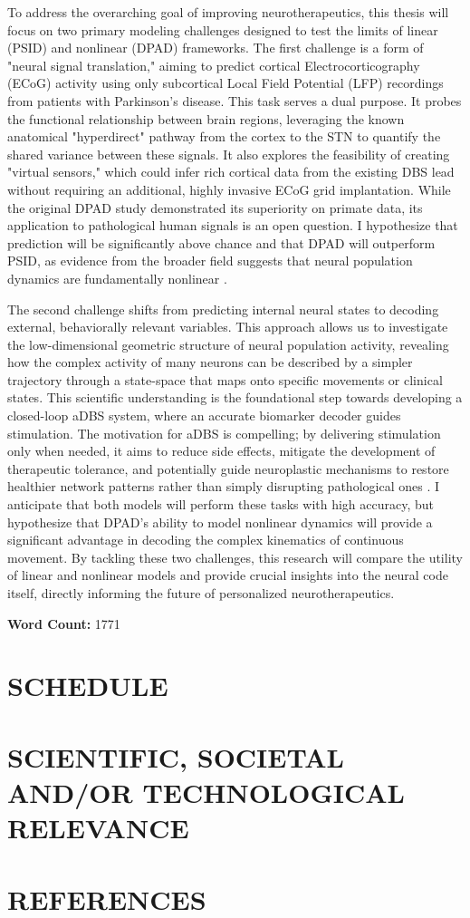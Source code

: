 \documentclass[12pt, a4paper]{article}
\begin{document}
To address the overarching goal of improving neurotherapeutics, this thesis will focus on two primary modeling challenges designed to test the limits of linear (PSID) and nonlinear (DPAD) frameworks. The first challenge is a form of "neural signal translation," aiming to predict cortical Electrocorticography (ECoG) activity using only subcortical Local Field Potential (LFP) recordings from patients with Parkinson's disease. This task serves a dual purpose. It probes the functional relationship between brain regions, leveraging the known anatomical "hyperdirect" pathway from the cortex to the STN \parencite{nambuFunctionalSignificanceCortico2002} to quantify the shared variance between these signals. It also explores the feasibility of creating "virtual sensors," which could infer rich cortical data from the existing DBS lead without requiring an additional, highly invasive ECoG grid implantation. While the original DPAD study demonstrated its superiority on primate data, its application to pathological human signals is an open question. I hypothesize that prediction will be significantly above chance and that DPAD will outperform PSID, as evidence from the broader field suggests that neural population dynamics are fundamentally nonlinear \parencite{breakspearDynamicModelsLargescale2017}.

The second challenge shifts from predicting internal neural states to decoding external, behaviorally relevant variables. This approach allows us to investigate the low-dimensional geometric structure of neural population activity, revealing how the complex activity of many neurons can be described by a simpler trajectory through a state-space that maps onto specific movements or clinical states. This scientific understanding is the foundational step towards developing a closed-loop aDBS system, where an accurate biomarker decoder guides stimulation. The motivation for aDBS is compelling; by delivering stimulation only when needed, it aims to reduce side effects, mitigate the development of therapeutic tolerance, and potentially guide neuroplastic mechanisms to restore healthier network patterns rather than simply disrupting pathological ones \parencite{kraussTechnologyDeepBrain2021}. I anticipate that both models will perform these tasks with high accuracy, but hypothesize that DPAD's ability to model nonlinear dynamics will provide a significant advantage in decoding the complex kinematics of continuous movement. By tackling these two challenges, this research will compare the utility of linear and nonlinear models and provide crucial insights into the neural code itself, directly informing the future of personalized neurotherapeutics.

\vspace{1em}
\noindent\textbf{Word Count:} 1771 
\newpage
\section{SCHEDULE}

\newpage

\section{SCIENTIFIC, SOCIETAL AND/OR TECHNOLOGICAL RELEVANCE}


\section{REFERENCES}
\printbibliography[heading=none]
\end{document}
